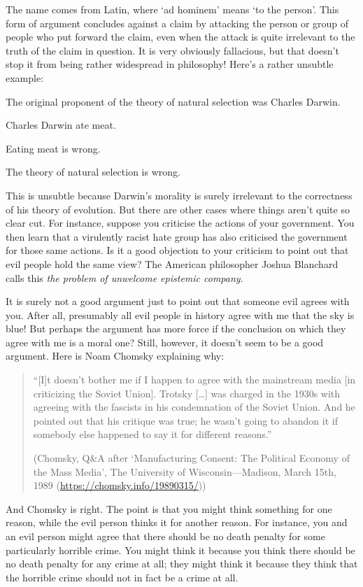 The name comes from Latin, where `ad hominem' means `to the person'. This form of argument concludes against a claim by attacking the person or group of people who put forward the claim, even when the attack is quite irrelevant to the truth of the claim in question. It is very obviously fallacious, but that doesn't stop it from being rather widespread in philosophy! Here's a rather unsubtle example:
\begin{earg}
\prem The original proponent of the theory of natural selection was Charles Darwin.

\prem Charles Darwin ate meat.

\prem Eating meat is wrong.

\conc The theory of natural selection is wrong.
\end{earg}
This is unsubtle because Darwin's morality is surely irrelevant to the correctness of his theory of evolution. But there are other cases where things aren't quite so clear cut. For instance, suppose you criticise the actions of your government. You then learn that a virulently racist hate group has also criticised the government for those same actions. Is it a good objection to your criticism to point out that evil people hold the same view? The American philosopher Joshua Blanchard calls this \emph{the problem of unwelcome epistemic company}.

It is surely not a good argument just to point out that someone evil agrees with you. After all, presumably all evil people in history agree with me that the sky is blue! But perhaps the argument has more force if the conclusion on which they agree with me is a moral one? Still, however, it doesn't seem to be a good argument. Here is Noam Chomsky explaining why:
\begin{quote}
``[I]t doesn’t bother me if I happen to agree with the mainstream media [in criticizing the  Soviet  Union]. Trotsky [\ldots] was charged in the 1930s with agreeing with the fascists in his condemnation of the Soviet Union. And he pointed out that his critique was true; he wasn't going to abandon it if somebody else happened to say it for different reasons.''

(Chomsky, Q\&A after `Manufacturing Consent: The Political Economy of the Mass Media', The University of Wisconsin---Madison, March 15th, 1989 (\url{https://chomsky.info/19890315/}))
\end{quote}
And Chomsky is right. The point is that you might think something for one reason, while the evil person thinks it for another reason. For instance, you and an evil person might agree that there should be no death penalty for some particularly horrible crime. You might think it because you think there should be no death penalty for any crime at all; they might think it because they think that the horrible crime should not in fact be a crime at all.

